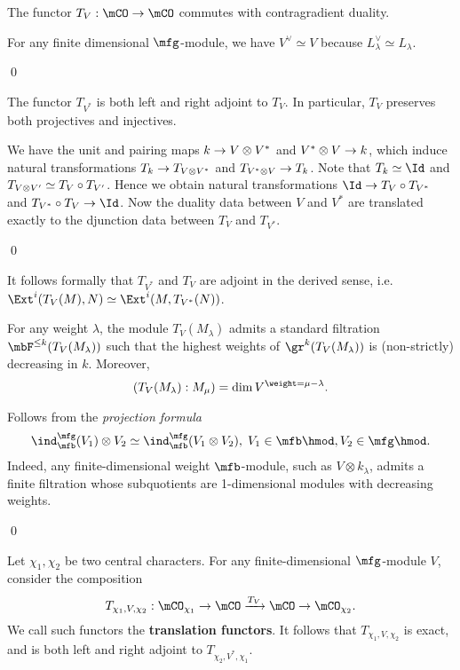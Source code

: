 	\begin{lem}
		The functor $T_V:\mCO \to \mCO$ commutes with contragradient duality.
	\end{lem}

	\proof
		For any finite dimensional $\mfg$-module, we have $V^\vee \simeq V$ because $L_\lambda^\vee \simeq L_\lambda$.

	\qed

	\begin{lem}
		The functor $T_{V^*}$ is both left and right adjoint to $T_V$. In particular, $T_V$ preserves both projectives and injectives.
	\end{lem}

	\proof
		We have the unit and pairing maps $k \to V\ot V^*$ and $V^* \ot V \to k$, which induce natural transformations $T_{k} \to T_{V\ot V^*}$ and $T_{V^*\ot V} \to T_k$. Note that $T_k \simeq \Id$ and $T_{V\ot V'} \simeq T_V \circ T_{V'}$. Hence we obtain natural transformations $\Id \to T_V \circ T_{V^*}$ and $T_{V^*} \circ T_{V} \to \Id$. Now the duality data between $V$ and $V^*$ are translated exactly to the djunction data between $T_V$ and $T_{V^*}$.


	\qed

	\begin{rem}
		It follows formally that $T_{V^*}$ and $T_V$ are adjoint in the derived sense, i.e. $\Ext^i( T_V(M),N )\simeq \Ext^i( M, T_{V^*}(N) )$.
	\end{rem}

	\begin{lem}
		\label{lem-st-fil-trans}
		For any weight $\lambda$, the module $T_V(M_\lambda)$ admits a standard filtration $\mbF^{\le k}(T_V(M_\lambda))$ such that the highest weights of $\gr^k(T_V(M_\lambda))$ is (non-strictly) decreasing in $k$. Moreover,
		\[
			(T_V(M_\lambda): M_\mu) = \dim V^{\weight = \mu-\lambda}.
		\]
	\end{lem}

	\proof
		Follows from the \emph{projection formula} 
		\[
			\ind_\mfb^\mfg(V_1) \ot V_2 \simeq \ind_\mfb^\mfg( V_1 \ot V_2 ),  \; V_1\in \mfb\hmod, V_2\in \mfg\hmod.
		\]
		Indeed, any finite-dimensional weight $\mfb$-module, such as $V\otimes k_\lambda$, admits a finite filtration whose subquotients are 1-dimensional modules with decreasing weights.

	\qed

	\begin{constr}
		Let $\chi_1,\chi_2$ be two central characters. For any finite-dimensional $\mfg$-module $V$, consider the composition
		\[
			T_{\chi_1,V,\chi_2}: \mCO_{\chi_1} \to \mCO \xrightarrow{T_V} \mCO \to \mCO_{\chi_2}.
		\]
		We call such functors the \textbf{translation functors}. It follows that $T_{\chi_1,V,\chi_2}$ is exact, and is both left and right adjoint to $T_{\chi_2,V^*,\chi_1}$.
	\end{constr}

